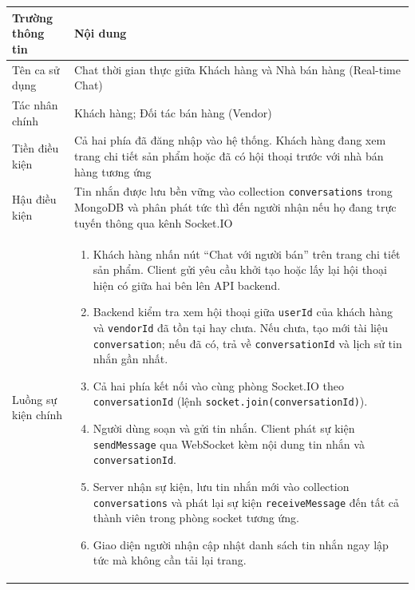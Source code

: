 \documentclass[../DoAn.tex]{subfiles}
\begin{document}
\renewcommand{\arraystretch}{1.3}
\label{table:ucB3_chat}
\noindent\begin{tabular}{|>{\columncolor{blue!6}\raggedright\arraybackslash}p{3.5cm}|>{\raggedright\arraybackslash}p{10.5cm}|}
\hline
\rowcolor{blue!18}
\textbf{Trường thông tin} & \textbf{Nội dung} \\
\hline
Tên ca sử dụng & Chat thời gian thực giữa Khách hàng và Nhà bán hàng (Real-time Chat) \\
\hline
Tác nhân chính & Khách hàng; Đối tác bán hàng (Vendor) \\
\hline
Tiền điều kiện & Cả hai phía đã đăng nhập vào hệ thống. Khách hàng đang xem trang chi tiết sản phẩm hoặc đã có hội thoại trước với nhà bán hàng tương ứng \\
\hline
Hậu điều kiện & Tin nhắn được lưu bền vững vào collection \texttt{conversations} trong MongoDB và phân phát tức thì đến người nhận nếu họ đang trực tuyến thông qua kênh Socket.IO \\
\hline
Luồng sự kiện chính &
\begin{minipage}[t]{10.3cm}
\vspace{2pt}
\raggedright
\begin{enumerate}[leftmargin=1.5em, topsep=0pt, parsep=0pt, itemsep=2pt, partopsep=0pt]
    \item Khách hàng nhấn nút ``Chat với người bán'' trên trang chi tiết sản phẩm. Client gửi yêu cầu khởi tạo hoặc lấy lại hội thoại hiện có giữa hai bên lên API backend.
    \item Backend kiểm tra xem hội thoại giữa \texttt{userId} của khách hàng và \texttt{vendorId} đã tồn tại hay chưa. Nếu chưa, tạo mới tài liệu \texttt{conversation}; nếu đã có, trả về \texttt{conversationId} và lịch sử tin nhắn gần nhất.
    \item Cả hai phía kết nối vào cùng phòng Socket.IO theo \texttt{conversationId} (lệnh \texttt{socket.join(conversationId)}).
    \item Người dùng soạn và gửi tin nhắn. Client phát sự kiện \texttt{sendMessage} qua WebSocket kèm nội dung tin nhắn và \texttt{conversationId}.
    \item Server nhận sự kiện, lưu tin nhắn mới vào collection \texttt{conversations} và phát lại sự kiện \texttt{receiveMessage} đến tất cả thành viên trong phòng socket tương ứng.
    \item Giao diện người nhận cập nhật danh sách tin nhắn ngay lập tức mà không cần tải lại trang.

\end{enumerate}
\end{minipage}
\end{tabular}
\end{document}
